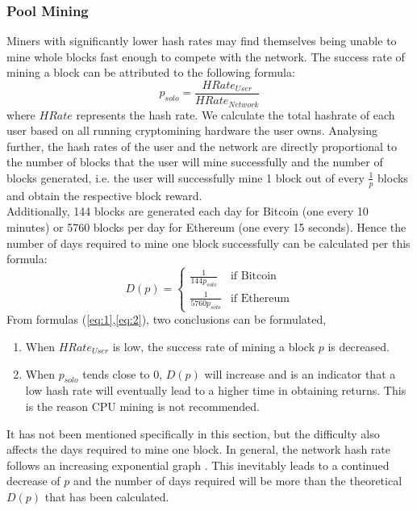 \documentclass[a4paper,12pt]{article}
\begin{document}
{	\subsubsection{Pool Mining}
	\label{poolmine}
	Miners with significantly lower hash rates may find themselves being unable to mine whole blocks fast enough to compete with the network. The success rate of mining a block can be attributed to the following formula:
	\begin{equation}\label{eq:1} p_{solo}=\frac{\textit{$HRate_{User}$}}{\textit{$HRate_{Network}$}}\end{equation} where $HRate$ represents the hash rate. We calculate the total hashrate of each user based on all running cryptomining hardware the user owns. Analysing further, the hash rates of the user and the network are directly proportional to the number of blocks that the user will mine successfully and the number of blocks generated, i.e. the user will successfully mine 1 block out of every $\frac{1}{p}$ blocks and obtain the respective block reward.\\\newline
	Additionally, 144 blocks are generated each day for Bitcoin (one every 10 minutes) or 5760 blocks per day for Ethereum (one every 15 seconds). Hence the number of days required to mine one block successfully can be calculated per this formula:
	\begin{equation}\label{eq:2}
	D(p)=\begin{cases}\frac{1}{144p_{solo}}&\text{if Bitcoin}\\\frac{1}{5760p_{solo}}&\text{if Ethereum}\end{cases}
	\end{equation}
	From formulas (\ref{eq:1},\ref{eq:2}), two conclusions can be formulated,
	\begin{enumerate}
		\item When $HRate_{User}$ is low, the success rate of mining a block $p$ is decreased.
		\item When $p_{solo}$ tends close to $0$, $D(p)$ will increase and is an indicator that a low hash rate will eventually lead to a higher time in obtaining returns. This is the reason \ac{CPU} mining is not recommended.
	\end{enumerate}
It has not been mentioned specifically in this section, but the difficulty also affects the days required to mine one block. In general, the network hash rate follows an increasing exponential graph \cite{bchashrate}. This inevitably leads to a continued decrease of $p$ and the number of days required will be more than the theoretical $D(p)$ that has been calculated.\\\newline
}
\end{document}
